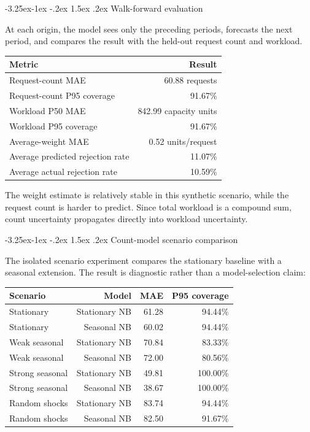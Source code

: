 \documentclass[11pt,a4paper]{article}
\makeatletter
\renewcommand\subsection{\@startsection{subsection}{2}{\z@}%
  {-3.25ex\@plus -1ex \@minus -.2ex}%
  {1.5ex \@plus .2ex}%
  {\normalfont\normalsize\bfseries\color{bodyblue}}}
\makeatother
\begin{document}
\subsection{Walk-forward evaluation}

At each origin, the model sees only the preceding periods, forecasts the next
period, and compares the result with the held-out request count and workload.

\begin{center}
\begin{tabular}{lr}
\toprule
\textbf{Metric} & \textbf{Result}\\
\midrule
Request-count MAE & 60.88 requests\\
Request-count P95 coverage & 91.67\%\\
Workload P50 MAE & 842.99 capacity units\\
Workload P95 coverage & 91.67\%\\
Average-weight MAE & 0.52 units/request\\
Average predicted rejection rate & 11.07\%\\
Average actual rejection rate & 10.59\%\\
\bottomrule
\end{tabular}
\end{center}

The weight estimate is relatively stable in this synthetic scenario, while the
request count is harder to predict. Since total workload is a compound sum,
count uncertainty propagates directly into workload uncertainty.

\subsection{Count-model scenario comparison}

The isolated scenario experiment compares the stationary baseline with a
seasonal extension. The result is diagnostic rather than a model-selection
claim:

\begin{center}
\normalsize
\begin{tabular}{lrrr}
\toprule
\textbf{Scenario} & \textbf{Model} & \textbf{MAE} & \textbf{P95 coverage}\\
\midrule
Stationary & Stationary NB & 61.28 & 94.44\%\\
Stationary & Seasonal NB & 60.02 & 94.44\%\\
Weak seasonal & Stationary NB & 70.84 & 83.33\%\\
Weak seasonal & Seasonal NB & 72.00 & 80.56\%\\
Strong seasonal & Stationary NB & 49.81 & 100.00\%\\
Strong seasonal & Seasonal NB & 38.67 & 100.00\%\\
Random shocks & Stationary NB & 83.74 & 94.44\%\\
Random shocks & Seasonal NB & 82.50 & 91.67\%\\
\bottomrule
\end{tabular}
\end{center}
\end{document}
